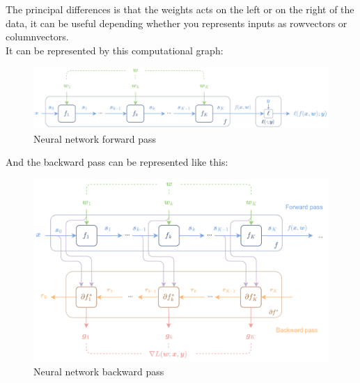 \documentclass[12pt, openany]{report}
\theoremstyle{definition}
\begin{document}
The principal differences is that the weights acts on the left or on the right of the data, it can be useful depending whether you represents inputs as rowvectors or columnvectors.\\
It can be represented by this computational graph:\\
\begin{figure}[H]
    \centering
    \includegraphics[width=\textwidth]{img/nn_fd.png}
    \caption{Neural network forward pass}
    \label{fig:nn_fd}
\end{figure}
And the backward pass can be represented like this:\\
\begin{figure}[H]
    \centering
    \includegraphics[width=\textwidth]{img/nn_bd.png}
    \caption{Neural network backward pass}
    \label{fig:nn_bd}
\end{figure}
\end{document}
